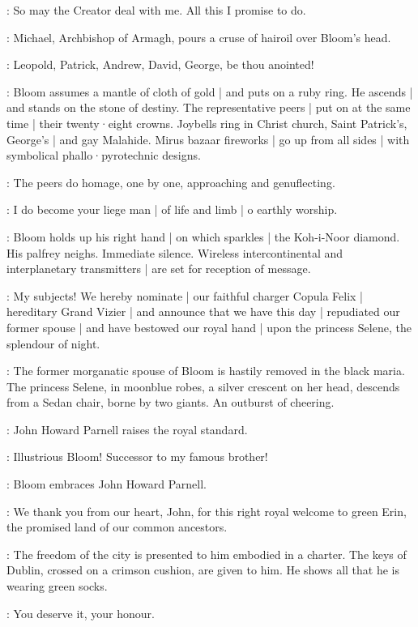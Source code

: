 \Bloom:
So may the Creator deal with me.
All this I promise to do.

:
Michael,
Archbishop of Armagh,
pours a cruse of hairoil over Bloom's head.

\MikeArmagh:
Leopold,
Patrick,
Andrew,
David,
George,
be thou anointed!

:
Bloom assumes a mantle of cloth of gold |
and puts on a ruby ring.
He ascends |
and stands on the stone of destiny.
The representative peers |
put on at the same time |
their twenty·eight crowns.
Joybells ring in Christ church,
Saint Patrick's,
George's |
and gay Malahide.
Mirus bazaar fireworks |
go up from all sides |
with symbolical phallo·pyrotechnic designs.

:
The peers do homage,
one by one,
approaching and genuflecting.

\Peers:
I do become your liege man |
of life and limb  |
o earthly worship.

:
Bloom holds up his right hand |
on which sparkles |
the Koh-i-Noor diamond.
His palfrey neighs.
Immediate silence.
Wireless intercontinental and interplanetary transmitters |
are set for reception of message.

\Bloom:
My subjects!
We hereby nominate |
our faithful charger Copula Felix |
hereditary Grand Vizier |
and announce that we have this day |
repudiated our former spouse |
and have bestowed our royal hand |
upon the princess Selene,
the splendour of night.

:
The former morganatic spouse of Bloom is hastily removed in the black maria.
The princess Selene,
in moonblue robes,
a silver crescent on her head,
descends from a Sedan chair,
borne by two giants.
An outburst of cheering.

:
John Howard Parnell raises the royal standard.

\Parnell:
Illustrious Bloom!
Successor to my famous brother!

:
Bloom embraces John Howard Parnell.

\Bloom:
We thank you from our heart,
John,
for this right royal welcome to green Erin,
the promised land of our common ancestors.

:
The freedom of the city is presented to him embodied in a charter.
The keys of Dublin,
crossed on a crimson cushion,
are given to him.%
He shows all that he is wearing green socks.

\Kernan[2]:
You deserve it,
your honour.

